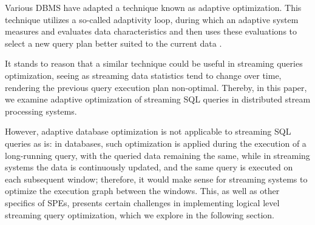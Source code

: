 Various DBMS have adapted a technique known as adaptive optimization. This technique utilizes a so-called adaptivity loop, during which an adaptive system measures and evaluates data characteristics and then uses these evaluations to select a new query plan better suited to the current data \cite{deshpande2007adaptive}. 


It stands to reason that a similar technique could be useful in streaming queries optimization, seeing as streaming data statistics tend to change over time, rendering the previous query execution plan non-optimal. Thereby, in this paper, we examine adaptive optimization of streaming SQL queries in distributed stream processing systems. 


However, adaptive database optimization is not applicable to streaming SQL queries as is: in databases, such optimization is applied during the execution of a long-running query, with the queried data remaining the same, while in streaming systems the data is continuously updated, and the same query is executed on each subsequent window; therefore, it would make sense for streaming systems to optimize the execution graph between the windows. This, as well as other specifics of SPEs, presents certain challenges in implementing logical level streaming query optimization, which we explore in the following section.

